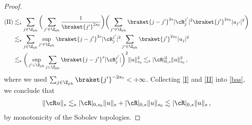 \documentclass[a4paper,reqno,10pt]{article}
\begin{document}
\begin{proof}
\begin{align}
    ({\rm II}) & \lesssim_{s}  \sum_{j\in \Z_{\rm ph}}\bigg(  \sum_{j'\in \Z_{\rm ph}} \frac{1}{\braket{j'}^{2s_0}} \bigg) \bigg(  \sum_{j'\in \Z_{\rm ph}} \braket{j-j'}^{2s}|\cR_{j}^{j'}|^2 \braket{j'}^{2s_0} |u_{j'}|^{2} \bigg) \\
    & \lesssim_{s} \sum_{j\in \Z_{\rm ph}} \sup_{j'\in\Z_{\rm ph}} \braket{j-j'}^{2s} |\cR_{j}^{j'}|^2 \sum_{j'\in\Z_{\rm ph}} \braket{j'}^{2s_0} |u_j|^2 \\
    & \lesssim_{s} \bigg( \sup_{j'\in \Z_{\rm ph}} \sum_{j\in\Z_{\rm ph}} \braket{j-j'}^{s} |\cR_{j}^{j'}| \bigg)^2 \| u \|_{s_0}^2 \lesssim_{s} |\cR|_{0,s}^{2}\| u \|_{s_0}^2 \,, \label{II}
\end{align}
where we used $\sum_{j\in \Z_{\rm ph}}\braket{j'}^{-2s_0}<+\infty$. Collecting \eqref{I} and \eqref{II} into \eqref{bas}, we conclude that
\begin{equation}\label{action.easy}
    \| \cR u \|_{s} \lesssim_s |\cR|_{0,s_0} \|u \|_{s}+ |\cR|_{0,s}\| u \|_{s_0} \lesssim |\cR|_{0,s} \|u \|_{s}\,,
\end{equation}
by monotonicity of the Sobolev topologies.



\end{proof}
\end{document}
